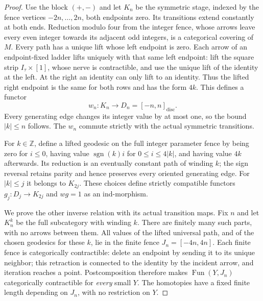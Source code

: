 \begin{proof}
Use the block $(+,-)$ and let $K_n$ be the symmetric stage,
indexed by the fence vertices $-2n,\ldots,2n$, both endpoints
zero. Its transitions extend constantly at both ends. Reduction
modulo four from the integer fence, whose arrows leave every even
integer towards its adjacent odd integers, is a categorical
covering of $M$. Every path has a unique lift whose left endpoint
is zero. Each arrow of an endpoint-fixed ladder lifts uniquely
with that same left endpoint: lift the square strip
$I_\tau\times[1]$, whose nerve is contractible, and use the
unique lift of the identity at the left. At the right an identity
can only lift to an identity. Thus the lifted right endpoint is
the same for both rows and has the form $4k$. This defines a
functor
\[
 w_n:K_n\longrightarrow D_n=[-n,n]_{\mathrm{disc}}.
\]
Every generating edge changes its integer value by at most one,
so the bound $|k|\leq n$ follows. The $w_n$ commute strictly
with the actual symmetric transitions.

For $k\in\mathbb Z$, define a lifted geodesic on the full
integer parameter fence by being zero for $i\leq0$, having value
$\operatorname{sgn}(k)i$ for $0\leq i\leq4|k|$, and having
value $4k$ afterwards. Its reduction is an eventually constant
path of winding $k$; the sign reversal retains parity and hence
preserves every oriented generating edge. For $|k|\leq j$ it
belongs to $K_{2j}$. These choices define strictly compatible
functors $g_j:D_j\to K_{2j}$ and $w g=1$ as an ind-morphism.

We prove the other inverse relation with its actual transition
maps. Fix $n$ and let $K_n^k$ be the full subcategory with winding
$k$. There are finitely many such parts, with no arrows between
them. All values of the lifted universal path, and of the chosen
geodesics for these $k$, lie in the finite fence
$J_n=[-4n,4n]$. Each finite fence is categorically contractible:
delete an endpoint by sending it to its unique neighbor; this
retraction is connected to the identity by the incident arrow,
and iteration reaches a point. Postcomposition therefore makes
$\operatorname{Fun}(Y,J_n)$ categorically contractible for
\emph{every} small $Y$. The homotopies have a fixed finite
length depending on $J_n$, with no restriction on $Y$.


\end{proof}
